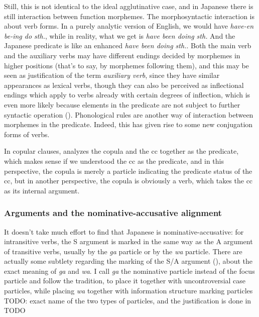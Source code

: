 \documentclass[UTF8, a4paper, oneside, scheme=plain]{ctexart}
\newcommand*{\term}[1]{\emph{#1}}
\newcommand{\corpus}[1]{\emph{#1}}
\begin{document}
Still, this is not identical to the ideal agglutinative case,
and in Japanese there is still interaction between function morphemes.
The morphosyntactic interaction is about verb forms.
In a purely analytic version of English,
we would have \corpus{have-en be-ing do sth.},
while in reality, what we get is \corpus{have been doing sth.}
And the Japanese predicate is like an enhanced \corpus{have been doing sth.}.
Both the main verb and the auxiliary verbs may have different endings 
decided by morphemes in higher positions (that's to say, by morphemes following them),
and this may be seen as justification of the term \term{auxiliary verb},
since they have similar appearances as lexical verbs,
though they can also be perceived as inflectional endings 
which apply to verbs already with certain degrees of inflection,
which is even more likely because elements in the predicate are not subject to further syntactic operation
().
Phonological rules are another way of interaction between morphemes in the predicate.
Indeed, this has given rise to some new conjugation forms of verbs.

In copular clauses,
\citet{tsutsui1989dictionary} analyzes the copula and the \acs{cc} together as the predicate,
which makes sense if we understood the \acs{cc} as the predicate,
and in this perspective, the copula is merely a particle indicating the predicate status of the \acs{cc},
but in another perspective, the copula is obviously a verb,
which takes the \acs{cc} as its internal argument.

\subsubsection{Arguments and the nominative-accusative alignment}\label{sec:alignment}

It doesn't take much effort to find that Japanese is nominative-accusative:
for intransitive verbs,
the S argument is marked in the same way as the A argument of transitive verbs,
usually by the \corpus{ga} particle or by the \corpus{wa} particle.
There are actually some subtlety regarding the marking of the S/A argument (),
about the exact meaning of \corpus{ga} and \corpus{wa}.
I call \corpus{ga} the nominative particle instead of the focus particle 
and follow the tradition, to place it together with uncontroversial case particles,
while placing \corpus{wa} together with information structure marking particles TODO: exact name of the two types of particles,
and the justification is done in TODO
\end{document}
